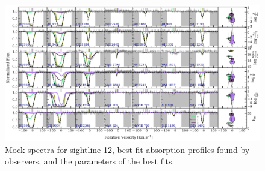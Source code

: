 \documentclass[fleqn,usenatbib]{mnras}
\begin{document}
\begin{figure}
    \centering
    \includegraphics[width=\textwidth]{figures/sample2/best_fits/0012.pdf}
    \caption{
    Mock spectra for sightline 12,
    best fit absorption profiles found by observers,
    and the parameters of the best fits.
    }
    \label{f: sample2 spectrum 12}
\end{figure}
\end{document}
